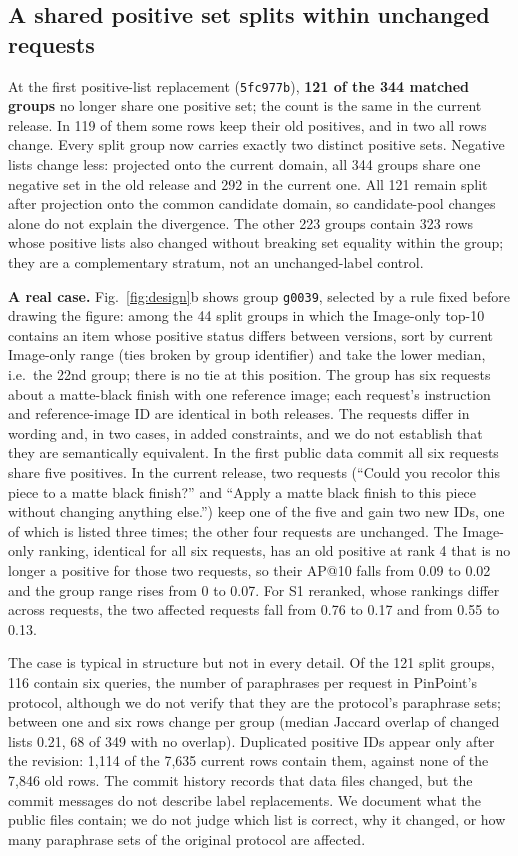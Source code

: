 \documentclass[conference]{IEEEtran}
\begin{document}
\subsection{A shared positive set splits within unchanged requests}\label{sec:res-split}
At the first positive-list replacement (\texttt{5fc977b}), \textbf{121 of the 344 matched groups} no longer share one positive set; the count is the same in the current release. In 119 of them some rows keep their old positives, and in two all rows change. Every split group now carries exactly two distinct positive sets. Negative lists change less: projected onto the current domain, all 344 groups share one negative set in the old release and 292 in the current one. All 121 remain split after projection onto the common candidate domain, so candidate-pool changes alone do not explain the divergence. The other 223 groups contain 323 rows whose positive lists also changed without breaking set equality within the group; they are a complementary stratum, not an unchanged-label control.

\textbf{A real case.} Fig.~\ref{fig:design}b shows group \texttt{g0039}, selected by a rule fixed before drawing the figure: among the 44 split groups in which the Image-only top-10 contains an item whose positive status differs between versions, sort by current Image-only range (ties broken by group identifier) and take the lower median, i.e.\ the 22nd group; there is no tie at this position. The group has six requests about a matte-black finish with one reference image; each request's instruction and reference-image ID are identical in both releases. The requests differ in wording and, in two cases, in added constraints, and we do not establish that they are semantically equivalent. In the first public data commit all six requests share five positives. In the current release, two requests (``Could you recolor this piece to a matte black finish?'' and ``Apply a matte black finish to this piece without changing anything else.'') keep one of the five and gain two new IDs, one of which is listed three times; the other four requests are unchanged. The Image-only ranking, identical for all six requests, has an old positive at rank 4 that is no longer a positive for those two requests, so their AP@10 falls from 0.09 to 0.02 and the group range rises from 0 to 0.07. For S1 reranked, whose rankings differ across requests, the two affected requests fall from 0.76 to 0.17 and from 0.55 to 0.13.

The case is typical in structure but not in every detail. Of the 121 split groups, 116 contain six queries, the number of paraphrases per request in PinPoint's protocol, although we do not verify that they are the protocol's paraphrase sets; between one and six rows change per group (median Jaccard overlap of changed lists 0.21, 68 of 349 with no overlap). Duplicated positive IDs appear only after the revision: 1,114 of the 7,635 current rows contain them, against none of the 7,846 old rows. The commit history records that data files changed, but the commit messages do not describe label replacements. We document what the public files contain; we do not judge which list is correct, why it changed, or how many paraphrase sets of the original protocol are affected.
\end{document}
